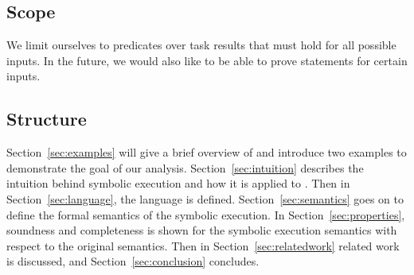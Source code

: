 \subsection{Scope}

We limit ourselves to predicates over task results that must hold for all possible inputs.
In the future, we would also like to be able to prove statements for certain inputs.

\subsection{Structure}
Section~\ref{sec:examples} will give a brief overview of \TOPHAT and introduce two examples to demonstrate the goal of our analysis.
Section~\ref{sec:intuition} describes the intuition behind symbolic execution and how it is applied to \TOPHAT.
Then in Section~\ref{sec:language}, the \TOPHAT language is defined.
Section~\ref{sec:semantics} goes on to define the formal semantics of the symbolic execution.
In Section~\ref{sec:properties}, soundness and completeness is shown for the symbolic execution semantics with respect to the original \TOPHAT semantics.
Then in Section~\ref{sec:relatedwork} related work is discussed, and Section~\ref{sec:conclusion} concludes.
